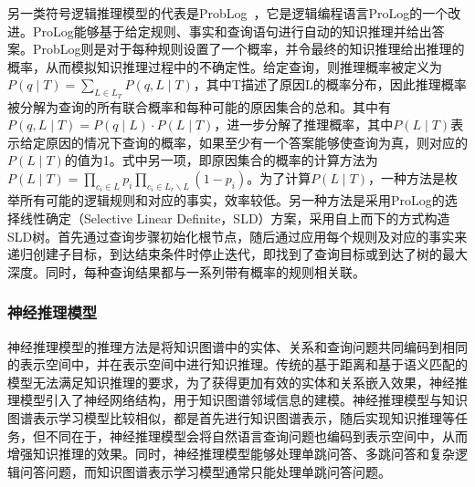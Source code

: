 \documentclass[algorithmlist, AutoFakeBold, AutoFakeSlant, figurelist, tablelist, nomlist, masters]{seuthesix}
\begin{document}
另一类符号逻辑推理模型的代表是ProbLog~\cite{de2007problog}，它是逻辑编程语言ProLog的一个改进。ProLog能够基于给定规则、事实和查询语句进行自动的知识推理并给出答案。ProbLog则是对于每种规则设置了一个概率，并令最终的知识推理给出推理的概率，从而模拟知识推理过程中的不确定性。给定查询，则推理概率被定义为$P\left(q \mid T\right)=\sum_{L \in L_T} P(q, L \mid T)$，其中T描述了原因L的概率分布，因此推理概率被分解为查询的所有联合概率和每种可能的原因集合的总和。其中有$P(q, L \mid T)=P(q \mid L) \cdot P(L \mid T)$，进一步分解了推理概率，其中$P(L \mid T)$表示给定原因的情况下查询的概率，如果至少有一个答案能够使查询为真，则对应的$P(L \mid T)$的值为1。式中另一项，即原因集合的概率的计算方法为$P(L \mid T)=\prod_{c_i \in L} p_i \prod_{c_i \in L_r \backslash L}\left(1-p_i\right)$。为了计算$P(L \mid T)$，一种方法是枚举所有可能的逻辑规则和对应的事实，效率较低。另一种方法是采用ProLog的选择线性确定（Selective Linear Definite，SLD）方案，采用自上而下的方式构造SLD树。首先通过查询步骤初始化根节点，随后通过应用每个规则及对应的事实来递归创建子目标，到达结束条件时停止迭代，即找到了查询目标或到达了树的最大深度。同时，每种查询结果都与一系列带有概率的规则相关联。

\subsubsection{神经推理模型}
神经推理模型的推理方法是将知识图谱中的实体、关系和查询问题共同编码到相同的表示空间中，并在表示空间中进行知识推理。传统的基于距离和基于语义匹配的模型无法满足知识推理的要求，为了获得更加有效的实体和关系嵌入效果，神经推理模型引入了神经网络结构，用于知识图谱邻域信息的建模。神经推理模型与知识图谱表示学习模型比较相似，都是首先进行知识图谱表示，随后实现知识推理等任务，但不同在于，神经推理模型会将自然语言查询问题也编码到表示空间中，从而增强知识推理的效果。同时，神经推理模型能够处理单跳问答、多跳问答和复杂逻辑问答问题，而知识图谱表示学习模型通常只能处理单跳问答问题。
\end{document}
